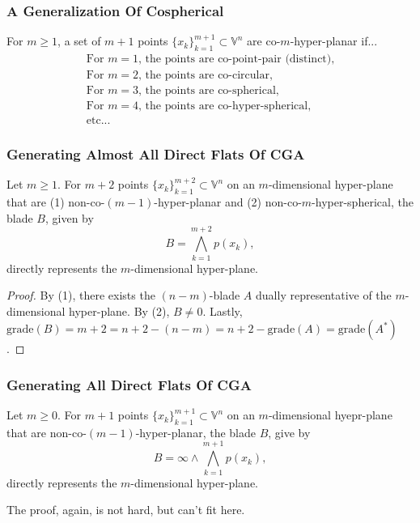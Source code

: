 \documentclass{beamer}
\newcommand{\V}{\mathbb{V}}
\newcommand{\nvai}{\infty}
\newcommand{\grade}{\mbox{grade}}
\begin{document}
\begin{frame}
\frametitle{A Generalization Of Cospherical}
\begin{definition}
For $m\geq 1$, a set of $m+1$ points $\{x_k\}_{k=1}^{m+1}\subset\V^n$ are \alert{co-$m$-hyper-planar} if...
\begin{equation*}
\begin{array}{l}
\mbox{For $m=1$, the points are co-point-pair (distinct),} \\
\mbox{For $m=2$, the points are co-circular,} \\
\mbox{For $m=3$, the points are co-spherical,} \\
\mbox{For $m=4$, the points are co-hyper-spherical,} \\
\mbox{etc...}
\end{array}
\end{equation*}
\end{definition}
\end{frame}

\begin{frame}
\frametitle{Generating \alert{Almost} All \alert{Direct Flats} Of CGA}
Let $m\geq 1$.
For $m+2$ points $\{x_k\}_{k=1}^{m+2}\subset\V^n$ on an $m$-dimensional hyper-plane that
are \alert{(1)} non-co-$(m-1)$-hyper-planar and \alert{(2)} non-co-$m$-hyper-spherical, the blade $B$,
given by
\begin{equation*}
B = \bigwedge_{k=1}^{m+2} p(x_k),
\end{equation*}
\alert{directly} represents the $m$-dimensional hyper-plane.\pause
\begin{proof}
By \alert{(1)}, there exists the $(n-m)$-blade $A$ \alert{dually} representative of the
$m$-dimensional hyper-plane.  By \alert{(2)}, $B\neq 0$.  Lastly,
$\grade(B)=m+2=n+2-(n-m)=n+2-\grade(A)=\grade(A^*)$.
\end{proof}
\end{frame}

\begin{frame}
\frametitle{Generating All \alert{Direct Flats} Of CGA}
Let $m\geq 0$.  For $m+1$ points $\{x_k\}_{k=1}^{m+1}\subset\V^n$ on an $m$-dimensional
hyepr-plane that are non-co-$(m-1)$-hyper-planar, the blade $B$, give by
\begin{equation*}
B = \nvai\wedge\bigwedge_{k=1}^{m+1} p(x_k),
\end{equation*}
\alert{directly} represents the $m$-dimensional hyper-plane.\pause

The proof, again, is not hard, but can't fit here.
\end{frame}
\end{document}
